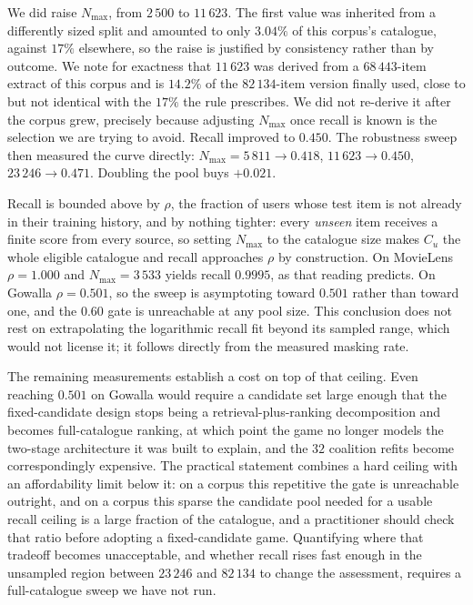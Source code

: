 \documentclass[pdflatex,sn-basic,Numbered]{sn-jnl}
\theoremstyle{plain}
\theoremstyle{definition}
\begin{document}
We did raise $N_{\max}$, from $2\,500$ to $11\,623$. The first value was inherited from a differently sized split and amounted to only $3.04\%$ of this
corpus's catalogue, against $17\%$ elsewhere, so the raise is justified by
consistency rather than by outcome. We note for exactness that $11\,623$ was
derived from a $68\,443$-item extract of this corpus and is $14.2\%$ of the
$82\,134$-item version finally used, close to but not identical with the $17\%$ the rule prescribes. We did not re-derive it after the corpus grew,
precisely because adjusting $N_{\max}$ once recall is known is the selection we
are trying to avoid. Recall improved to $0.450$. The robustness
sweep then measured the curve directly:
$N_{\max}=5\,811 \to 0.418$, $11\,623 \to 0.450$, $23\,246 \to 0.471$. Doubling
the pool buys $+0.021$.

Recall is bounded above by $\rho$, the fraction of users whose test item is not
already in their training history, and by nothing tighter: every \emph{unseen}
item receives a finite score from every source, so setting $N_{\max}$ to the
catalogue size makes $C_u$ the whole eligible catalogue and recall approaches
$\rho$ by construction. On MovieLens $\rho = 1.000$ and $N_{\max}=3\,533$
yields recall $0.9995$, as that reading predicts. On Gowalla $\rho = 0.501$,
so the sweep is asymptoting toward $0.501$ rather than toward one, and the
$0.60$ gate is unreachable at any pool size. This conclusion does not rest on
extrapolating the logarithmic recall fit beyond its sampled range, which would
not license it; it follows directly from the measured masking rate.

The remaining measurements establish a cost on top of that ceiling. Even
reaching $0.501$ on Gowalla would require a candidate set large enough that
the fixed-candidate design stops
being a retrieval-plus-ranking decomposition and becomes full-catalogue
ranking, at which point the game no longer models the two-stage architecture it
was built to explain, and the $32$ coalition refits become correspondingly
expensive. The practical statement combines a hard ceiling with an
affordability limit below it: on a corpus this repetitive the gate is
unreachable outright, and on a corpus this sparse the candidate pool
needed for a usable recall ceiling is a large fraction of the catalogue, and a
practitioner should check that ratio before adopting a fixed-candidate game.
Quantifying where that tradeoff becomes unacceptable, and whether recall rises
fast enough in the unsampled region between $23\,246$ and $82\,134$ to change
the assessment, requires a full-catalogue sweep we have not run.
\end{document}
